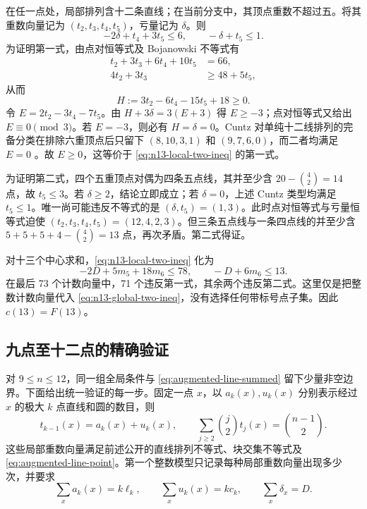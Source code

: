 在任一点处，局部排列含十二条直线；在当前分支中，其顶点重数不超过五。将其重数向量记为
$(t_2,t_3,t_4,t_5)$，亏量记为 $\delta$。则
\begin{equation}\label{eq:n13-local-two-ineq}
 -2\delta+t_4+3t_5\le6,
 \qquad -\delta+t_5\le1.
\end{equation}
为证明第一式，由点对恒等式及 Bojanowski 不等式有
\begin{align*}
 t_2+3t_3+6t_4+10t_5&=66,\\
 4t_2+3t_3&\ge48+5t_5,
\end{align*}
从而
\[
 H:=3t_2-6t_4-15t_5+18\ge0.
\]
令 $E=2t_2-3t_4-7t_5$。由 $H+3\delta=3(E+3)$ 得
$E\ge-3$；点对恒等式又给出 $E\equiv0\pmod3$。若 $E=-3$，则必有
$H=\delta=0$。Cuntz 对单纯十二线排列的完备分类在排除六重顶点后只留下
$(8,10,3,1)$ 和 $(9,7,6,0)$，而二者均满足 $E=0$
\cite[Theorem~1.1 and the invariant tables]{cuntz}。故 $E\ge0$，这等价于
\eqref{eq:n13-local-two-ineq} 的第一式。

为证明第二式，四个五重顶点对偶为四条五点线，其并至少含
$20-\binom42=14$ 点，故 $t_5\le3$。若 $\delta\ge2$，结论立即成立；若
$\delta=0$，上述 Cuntz 类型均满足 $t_5\le1$。唯一尚可能违反不等式的是
$(\delta,t_5)=(1,3)$。此时点对恒等式与亏量恒等式迫使
$(t_2,t_3,t_4,t_5)=(12,4,2,3)$。但三条五点线与一条四点线的并至少含
$5+5+5+4-\binom42=13$ 点，再次矛盾。第二式得证。

对十三个中心求和，\eqref{eq:n13-local-two-ineq} 化为
\begin{equation}\label{eq:n13-global-two-ineq}
 -2D+5m_5+18m_6\le78,
 \qquad -D+6m_6\le13.
\end{equation}
在最后 73 个计数向量中，71 个违反第一式，其余两个违反第二式。这里仅是把整数计数向量代入
\eqref{eq:n13-global-two-ineq}，没有选择任何带标号点子集。因此 $c(13)=F(13)$。

\subsection{九点至十二点的精确验证}

对 $9\le n\le12$，同一组全局条件与
\eqref{eq:augmented-line-summed} 留下少量非空边界。下面给出统一验证的每一步。固定一点 $x$，以 $a_k(x),u_k(x)$ 分别表示经过 $x$ 的极大
$k$ 点直线和圆的数目，则
\[
 t_{k-1}(x)=a_k(x)+u_k(x),
 \qquad
 \sum_{j\ge2}\binom j2t_j(x)=\binom{n-1}{2}.
\]
这些局部重数向量满足前述公开的直线排列不等式、块交集不等式及
\eqref{eq:augmented-line-point}。第一个整数模型只记录每种局部重数向量出现多少次，并要求
\[
 \sum_xa_k(x)=k\ell_k,\qquad
 \sum_xu_k(x)=kc_k,\qquad
 \sum_x\delta_x=D.
\]

